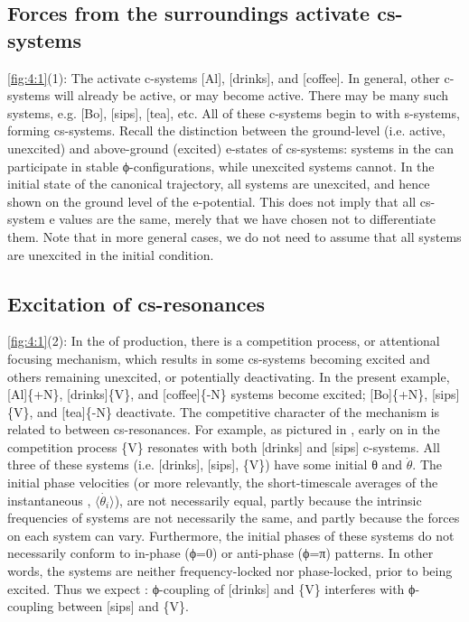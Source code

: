 \subsection{Forces from the surroundings activate cs-systems} 

\ref{fig:4:1}(1): The  activate c-systems [Al], [drinks], and [coffee]. In general, other c-systems will already be active, or may become active. There may be many such systems, e.g. [Bo], [sips], [tea], etc. All of these c-systems begin to  with s-systems, forming cs-systems. Recall the distinction between the ground-level (i.e. active, unexcited) and above-ground (excited) e-states of cs-systems: systems in the  can participate in stable ϕ-configurations, while unexcited systems cannot. In the initial state of the canonical trajectory, all systems are unexcited, and hence shown on the ground level of the e-potential. This does not imply that all cs-system e values are the same, merely that we have chosen not to differentiate them. Note that in more general cases, we do not need to assume that all systems are unexcited in the initial condition.

\subsection{Excitation of cs-resonances}

\ref{fig:4:1}(2): In the  of production, there is a competition process, or attentional focusing mechanism, which results in some cs-systems becoming excited and others remaining unexcited, or potentially deactivating. In the present example, [Al]\{+N\}, [drinks]\{V\}, and [coffee]\{-N\} systems become excited; [Bo]\{+N\}, [sips]\{V\}, and [tea]\{-N\} deactivate. The competitive character of the mechanism is related to  between cs-resonances. For example, as pictured in {}, early on in the competition process \{V\} resonates with both [drinks] and [sips] c-systems. All three of these systems (i.e. [drinks], [sips], \{V\}) have some initial θ and $\dot{\theta} $. The initial phase velocities (or more relevantly, the short-timescale averages of the instantaneous , $\langle\dot{\theta_i}\rangle$), are not necessarily equal, partly because the intrinsic frequencies of systems are not necessarily the same, and partly because the  forces on each system can vary. Furthermore, the initial phases of these systems do not necessarily conform to in-phase (ϕ=0) or anti-phase (ϕ=π) patterns. In other words, the systems are neither frequency-locked nor phase-locked, prior to being excited. Thus we expect : ϕ{}-coupling of [drinks] and \{V\} interferes with ϕ{}-coupling between [sips] and \{V\}.


